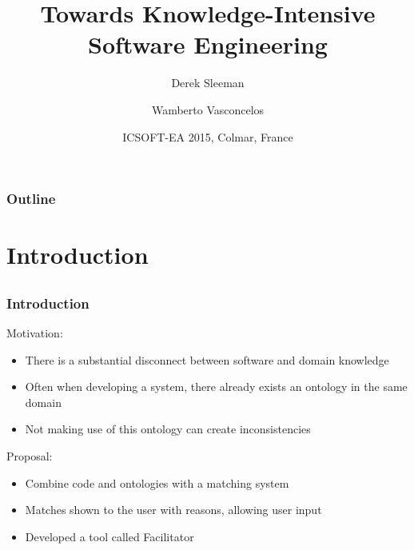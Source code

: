 \documentclass{beamer}
\newcommand{\myemph}[1]{{\bf {\color{emcolor}{#1}}}}
\begin{document}
\title{Towards Knowledge-Intensive Software Engineering}
\author{\myemph{Samuel Cauvin} \and Derek Sleeman \and Wamberto Vasconcelos}

\date{ICSOFT-EA 2015, Colmar, France}

\maketitle

\begin{frame}
  \frametitle{Outline}
  \tableofcontents
\end{frame}

\section{Introduction}
\subsection{}

\begin{frame}
  \frametitle{Introduction}
  Motivation:
  \begin{itemize}
    \item There is a substantial disconnect between software and domain knowledge
    \item Often when developing a system, there already exists an ontology in the same domain
    \item Not making use of this ontology can create inconsistencies
  \end{itemize}
  Proposal:
  \begin{itemize}
    \item Combine code and ontologies with a matching system
    \item Matches shown to the user with reasons, allowing user input
    \item Developed a tool called Facilitator
  \end{itemize}
\end{frame}
\end{document}

